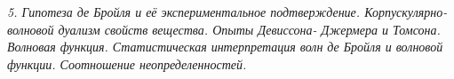 \emph{5. Гипотеза де Бройля и её экспериментальное подтверждение. 
Корпускулярно-волновой дуализм свойств вещества. Опыты Девиссона-
Джермера и Томсона. Волновая функция. Статистическая интерпретация 
волн де Бройля и волновой функции. Соотношение неопределенностей.}

\newpage
